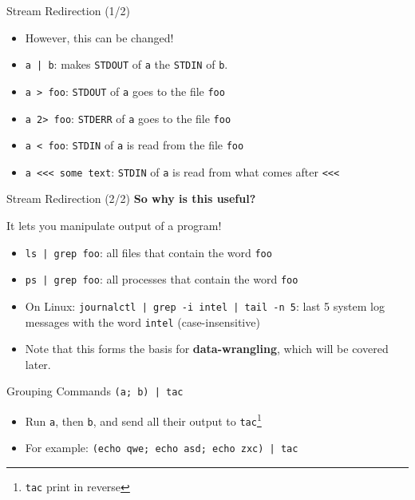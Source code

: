 \documentclass[12pt]{beamer}
\begin{document}
\begin{frame}[fragile]{Stream Redirection (1/2)}
  \begin{itemize}
    \item However, this can be changed!
    \item \texttt{a | b}: makes \texttt{STDOUT} of \texttt{a} the \texttt{STDIN} of \texttt{b}.
    \item \texttt{a > foo}: \texttt{STDOUT} of \texttt{a} goes to the file \texttt{foo}
    \item \texttt{a 2> foo}: \texttt{STDERR} of \texttt{a} goes to the file \texttt{foo}
    \item \texttt{a < foo}: \texttt{STDIN} of \texttt{a} is read from the file \texttt{foo}
    \item \texttt{a <<< some text}: \texttt{STDIN} of \texttt{a} is read from what comes after \texttt{<<<}
  \end{itemize}
\end{frame}

\begin{frame}[fragile]{Stream Redirection (2/2)}
  \textbf{So why is this useful?} \pause

  It lets you manipulate output of a program!
  \pause
  \begin{itemize}
    \item \texttt{ls | grep foo}: all files that contain the word \texttt{foo}
    \item \texttt{ps | grep foo}: all processes that contain the word \texttt{foo}
    \item On Linux: \texttt{journalctl | grep -i intel | tail -n 5}: last 5 system log messages with the word \texttt{intel} (case-insensitive)
    \item Note that this forms the basis for \textbf{data-wrangling}, which will be covered later.
  \end{itemize}
\end{frame}

\begin{frame}[fragile]{Grouping Commands}
  \texttt{(a; b) | tac}
  \begin{itemize}
    \item Run \texttt{a}, then \texttt{b}, and send all their output to \texttt{tac}\footnote{\texttt{tac} print in reverse}
    \item For example: \texttt{(echo qwe; echo asd; echo zxc) | tac}
  \end{itemize}
\end{frame}
\end{document}
